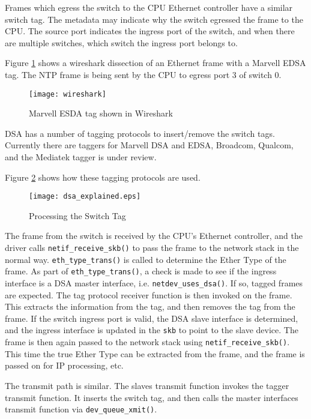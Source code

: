 \documentclass[letterpaper]{article}
\begin{document}
Frames which egress the switch to the CPU Ethernet controller have a
similar switch tag. The metadata may indicate why the switch egressed
the frame to the CPU. The source port indicates the ingress port of
the switch, and when there are multiple switches, which switch the
ingress port belongs to.

Figure \ref{wireshark} shows a wireshark dissection of an Ethernet
frame with a Marvell EDSA tag. The NTP frame is being sent by the CPU
to egress port 3 of switch 0.

\begin{figure}[ht]
  \centering
  \texttt{[image: wireshark]}
  \caption{Marvell ESDA tag shown in Wireshark}
  \label{wireshark}
\end{figure}

DSA has a number of tagging protocols to insert/remove the switch
tags. Currently there are taggers for Marvell DSA and EDSA, Broadcom,
Qualcom, and the Mediatek tagger is under review.

Figure \ref{stackflow} shows how these tagging protocols are used.

\begin{figure}[ht]
  \centering
  \texttt{[image: dsa\_explained.eps]}
  \caption{Processing the Switch Tag}
  \label{stackflow}
\end{figure}

The frame from the switch is received by the CPU's Ethernet controller,
and the driver calls \verb|netif_receive_skb()| to pass the frame to
the network stack in the normal way. \verb|eth_type_trans()| is called
to determine the Ether Type of the frame. As part of
\verb|eth_type_trans()|, a check is made to see if the ingress
interface is a DSA master interface, i.e. \verb|netdev_uses_dsa()|. If
so, tagged frames are expected. The tag protocol receiver function is
then invoked on the frame. This extracts the information from the tag,
and then removes the tag from the frame. If the switch ingress port is
valid, the DSA slave interface is determined, and the ingress
interface is updated in the \verb|skb| to point to the slave
device. The frame is then again passed to the network stack using
\verb|netif_receive_skb()|. This time the true Ether Type can be
extracted from the frame, and the frame is passed on for IP
processing, etc.

The transmit path is similar. The slaves transmit function invokes the
tagger transmit function. It inserts the switch tag, and then calls
the master interfaces transmit function via \verb|dev_queue_xmit()|.
\end{document}
